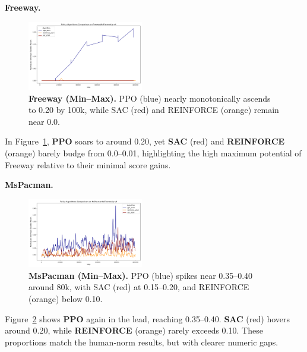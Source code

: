 \medskip

\textbf{Freeway.}
\begin{figure}[htbp]
	\centering
	\includegraphics[width=0.45\textwidth]{figures/policy_comparison/charts_episodic_return_minmax_comparison_FreewayNoFrameskip-v4_policy.png}
	\caption{\textbf{Freeway (Min--Max).} PPO (blue) nearly monotonically ascends to 0.20 by 100k, while SAC (red) and REINFORCE (orange) remain near 0.0.}
	\label{fig:policy_minmax_freeway}
\end{figure}

In Figure~\ref{fig:policy_minmax_freeway}, \textbf{PPO} soars to around 0.20, yet \textbf{SAC} (red) and \textbf{REINFORCE} (orange) barely budge from 0.0--0.01, highlighting the high maximum potential of Freeway relative to their minimal score gains.

\medskip

\textbf{MsPacman.}
\begin{figure}[htbp]
	\centering
	\includegraphics[width=0.45\textwidth]{figures/policy_comparison/charts_episodic_return_minmax_comparison_MsPacmanNoFrameskip-v4_policy.png}
	\caption{\textbf{MsPacman (Min--Max).} PPO (blue) spikes near 0.35--0.40 around 80k, with SAC (red) at 0.15--0.20, and REINFORCE (orange) below 0.10.}
	\label{fig:policy_minmax_mspacman}
\end{figure}

Figure~\ref{fig:policy_minmax_mspacman} shows \textbf{PPO} again in the lead, reaching 0.35--0.40. \textbf{SAC} (red) hovers around 0.20, while \textbf{REINFORCE} (orange) rarely exceeds 0.10. These proportions match the human‐norm results, but with clearer numeric gaps.

\medskip

